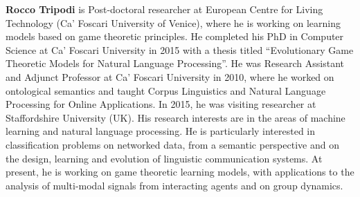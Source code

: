   {\bfseries Rocco Tripodi} is Post-doctoral researcher at European Centre for Living Technology (Ca' Foscari University of Venice), where he is working on learning models based on game theoretic principles. He completed his PhD in Computer Science at Ca' Foscari University in 2015 with a thesis titled ``Evolutionary Game Theoretic Models for Natural Language Processing''. He was Research Assistant and Adjunct Professor at Ca' Foscari University in 2010, where he worked on ontological semantics and taught Corpus Linguistics and Natural Language Processing for Online Applications. In 2015, he was visiting researcher at Staffordshire University (UK). His research interests are in the areas of machine learning and natural language processing. He is particularly interested in classification problems on networked data, from a semantic perspective and on the design, learning and evolution of linguistic communication systems. At present, he is working on game theoretic learning models, with applications to the analysis of multi-modal signals from interacting agents and on group dynamics.
